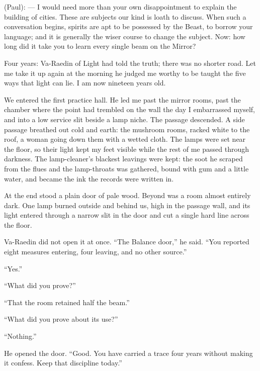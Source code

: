 \begin{room}
(Paul): --- I would need more than your own disappointment to explain the building of cities. These are subjects our kind is loath to discuss. When such a conversation begins, spirits are apt to be possessed by the Beast, to borrow your language; and it is generally the wiser course to change the subject. Now: how long did it take you to learn every single beam on the Mirror?

\end{room}

Four years: Va-Raedin of Light had told the truth; there was no shorter road. Let me take it up again at the morning he judged me worthy to be taught the five ways that light can lie. I am now nineteen years old.\par

\ornament

We entered the first practice hall. He led me past the mirror rooms, past the chamber where the point had trembled on the wall the day I embarrassed myself, and into a low service slit beside a lamp niche. The passage descended. A side passage breathed out cold and earth: the mushroom rooms, racked white to the roof, a woman going down them with a wetted cloth. The lamps were set near the floor, so their light kept my feet visible while the rest of me passed through darkness. The lamp-cleaner's blackest leavings were kept: the soot he scraped from the flues and the lamp-throats was gathered, bound with gum and a little water, and became the ink the records were written in.\par

At the end stood a plain door of pale wood. Beyond was a room almost entirely dark. One lamp burned outside and behind us, high in the passage wall, and its light entered through a narrow slit in the door and cut a single hard line across the floor. \par

Va-Raedin did not open it at once. ``The Balance door,'' he said. ``You reported eight measures entering, four leaving, and no other source.''\par

``Yes.''\par
``What did you prove?''\par
``That the room retained half the beam.''\par
``What did you prove about its use?''\par
``Nothing.''\par

He opened the door. ``Good. You have carried a trace four years without making it confess. Keep that discipline today.''\par

